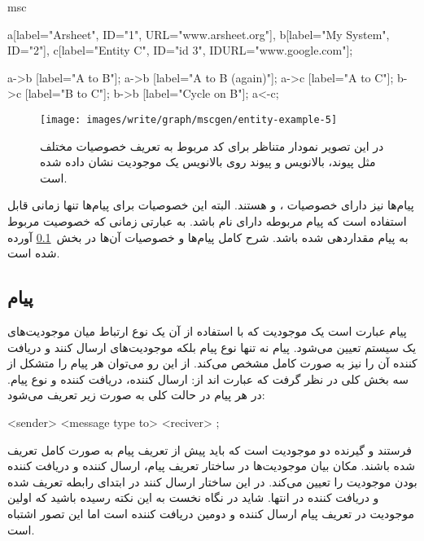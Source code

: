 \begin{MSC}
msc {
	 a[label="Arsheet", ID="1", URL="www.arsheet.org"],
	 b[label="My System", ID="2"],
	 c[label="Entity C", ID="id 3", IDURL="www.google.com"];
	 
	 a->b [label="A to B"];
	 a->b [label="A to B (again)"];
	 a->c [label="A to C"];
  	 b->c [label="B to C"];
  	 b->b [label="Cycle on B"];
  	 a<-c;
}
\end{MSC}

\begin{figure}[h]
	\centering
	\texttt{[image: images/write/graph/mscgen/entity-example-5]}
	\caption[مثالی از نحوه تعریف خصوصیات مختلف موجودیت‌ها برای ایجاد شناسه
	بالانویس و پیوند]
	{در این تصویر نمودار متناظر برای کد مربوط به تعریف
	خصوصیات مختلف مثل پیوند، بالانویس و پیوند روی بالانویس یک موجودیت نشان داده شده
	است.}
	\label{images/write/graph/mscgen/entity-example-5}
\end{figure}

\begin{note}
پیام‌ها نیز دارای خصوصیات ،  و  هستند. البته این
خصوصیات برای پیام‌ها تنها زمانی قابل استفاده است که پیام مربوطه دارای نام باشد.
به عبارتی زمانی که خصوصیت  مربوط به پیام مقداردهی شده باشد. شرح کامل
پیام‌ها و خصوصیات آن‌ها در بخش~\ref{sec:message} آورده شده است.
\end{note}

\subsection{پیام}
\label{sec:message}

پیام عبارت است یک موجودیت که با استفاده از آن یک نوع ارتباط میان موجودیت‌های یک
سیستم تعیین می‌شود. پیام نه تنها نوع پیام بلکه موجودیت‌های ارسال کنند و دریافت
کننده آن را نیز به صورت کامل مشخص می‌کند. از این رو می‌توان هر پیام را متشکل از
سه بخش کلی در نظر گرفت که عبارت اند از: ارسال کننده، دریافت کننده و نوع پیام. در
 هر پیام در حالت کلی به صورت زیر تعریف می‌شود:

\begin{MSC}
<sender> <message type to> <reciver>  ;
\end{MSC}

فرستند و گیرنده دو موجودیت  است که باید پیش از تعریف پیام به صورت کامل تعریف شده
باشند. مکان بیان موجودیت‌ها در ساختار تعریف پیام، ارسال کننده و دریافت کننده
بودن موجودیت را تعیین می‌کند. در این ساختار ارسال کنند در ابتدای رابطه تعریف شده
و دریافت کننده در انتها. شاید در نگاه نخست به این نکته رسیده باشید که اولین
موجودیت در تعریف پیام ارسال کننده و دومین دریافت کننده است اما این تصور اشتباه
است.

